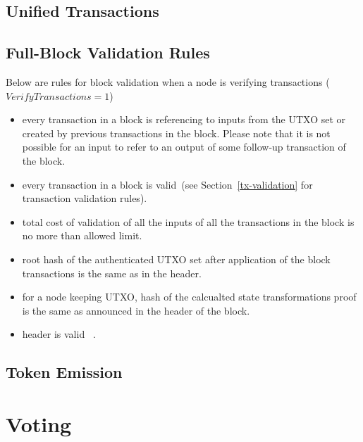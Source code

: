 \documentclass[]{article}   %
\newcommand{\authnote}[2]{\marginpar{\parbox{\marginparwidth}{\tiny %
  \textsf{#1 {\textcolor{blue}{notes: #2}}}}}%
  \textcolor{blue}{\textbf{\dag}}}
\newcommand{\authnote}[2]{
  \textsf{#1 \textcolor{blue}{: #2}}}
\newcommand{\authnote}[2]{}
\newcommand{\knote}[1]{{\authnote{\textcolor{green}{Alex notes}}{#1}}}
\newcommand{\vnote}[1]{{\authnote{\textcolor{purple}{Vasily notes}}{#1}}}
\begin{document}
\subsection{Unified Transactions}

\knote{Write about fee as boxes and absence of out-of-thin-air emission in the "coinbase" transaction.}

\subsection{Full-Block Validation Rules}

Below are rules for block validation when a node is verifying transactions ($VerifyTransactions = 1$)

\begin{itemize}
    \item{} every transaction in a block is referencing to inputs from the UTXO set or created by previous transactions
    in the block. Please note that it is not possible for an input to refer to an output of some follow-up transaction
    of the block.
    \item{} every transaction in a block is valid~(see Section~\ref{tx-validation} for transaction validation rules).
    \item{} total cost of validation of all the inputs of all the transactions in the block is no more than
    allowed limit.
    \item{} root hash of the authenticated UTXO set after application of the block transactions is the same as
    in the header.
    \item{} for a node keeping UTXO, hash of the calcualted state transformations proof is the same as announced
    in the header of the block.
    \item{} header is valid~\knote{link to header validation rules}.
\end{itemize}

\knote{mention emission rules. extractEmissionBox is buggy probably.}
\knote{extension validation rules}

\subsection{Token Emission}
\vnote{outputs->boxes?}


\section{Voting}

\end{document}
